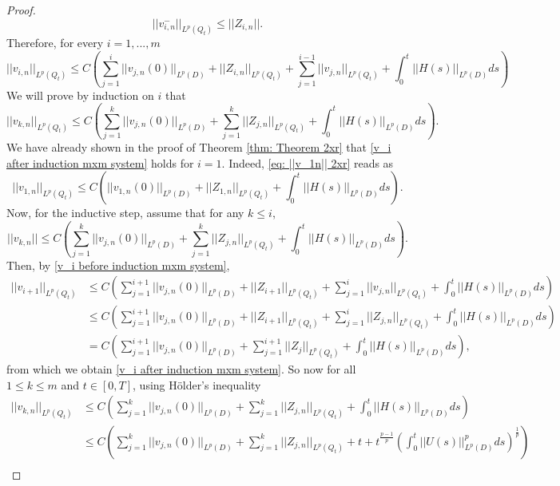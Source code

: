 \documentclass[12pt]{article}
\theoremstyle{definition}
\theoremstyle{remark}
\begin{document}
\begin{proof}
    \[
    ||v_{i,n}^{-}||_{L^p(Q_t)}\leq ||Z_{i,n}||.
    \]
    Therefore, for every $i=1,...,m$
    \begin{equation}\label{v_i before induction mxm system}
        ||v_{i,n}||_{L^p(Q_t)}\leq C\left(\sum_{j=1}^{i} ||v_{j,n}(0)||_{L^p(D)}+||Z_{i,n}||_{L^p(Q_t)}+\sum_{j=1}^{i-1}||v_{j,n}||_{L^p(Q_t)} + \int_0^t ||H(s)||_{L^p(D)}ds\right)
    \end{equation}
    We will prove by induction on $i$ that
    \begin{equation}\label{v_i after induction mxm system}
        ||v_{k,n}||_{L^p(Q_t)}\leq C\left(\sum_{j=1}^{k} ||v_{j,n}(0)||_{L^p(D)}+\sum_{j=1}^{k} ||Z_{j,n}||_{L^p(Q_t)}+\int_0^t ||H(s)||_{L^p(D)}ds\right).
    \end{equation}
    We have already shown in the proof of Theorem \ref{thm: Theorem 2xr} that \eqref{v_i after induction mxm system} holds for $i=1$. Indeed,  \eqref{eq: ||v_1n|| 2xr} reads as
    \[
    ||v_{1,n}||_{L^p(Q_t)} \leq C\left(||v_{1,n}(0)||_{L^p(D)}+||Z_{1,n}||_{L^p(Q_t)}+\int_0^t ||H(s)||_{L^p(D)}ds\right).
    \]
    Now, for the inductive step, assume that for any $k\leq i$,
    \[
    ||v_{k,n}||\leq C\left(\sum_{j=1}^{k} ||v_{j,n}(0)||_{L^p(D)}+\sum_{j=1}^{k} ||Z_{j,n}||_{L^p(Q_t)}+\int_0^t ||H(s)||_{L^p(D)}ds\right).
    \]
    Then, by \eqref{v_i before induction mxm system},
    \begin{align*}
        ||v_{i+1}||_{L^p(Q_t)}&\leq C\left(\sum_{j=1}^{i+1} ||v_{j,n}(0)||_{L^p(D)}+||Z_{i+1}||_{L^p(Q_t)} + \sum_{j=1}^i ||v_{j,n}||_{L^p(Q_t)} + \int_0^t ||H(s)||_{L^p(D)}ds\right)\\
        &\leq C\left(\sum_{j=1}^{i+1} ||v_{j,n}(0)||_{L^p(D)}+||Z_{i+1}||_{L^p(Q_t)}+\sum_{j=1}^i ||Z_{j,n}||_{L^p(Q_t)}+\int_0^t ||H(s)||_{L^p(D)}ds\right)\\
        &= C\left(\sum_{j=1}^{i+1} ||v_{j,n}(0)||_{L^p(D)}+\sum_{j=1}^{i+1}||Z_{j}||_{L^p(Q_t)}+\int_0^t ||H(s)||_{L^p(D)}ds\right),
    \end{align*}
    from which we obtain \eqref{v_i after induction mxm system}. So now for all $1\leq k\leq m$ and $t\in [0,T]$, using H\"older's inequality
    \begin{align*}
        ||v_{k,n}||_{L^p(Q_t)}&\leq C\left(\sum_{j=1}^{k} ||v_{j,n}(0)||_{L^p(D)}+\sum_{j=1}^k ||Z_{j,n}||_{L^p(Q_t)}+\int_0^t ||H(s)||_{L^p(D)}ds\right)\\
        &\leq C\left(\sum_{j=1}^{k} ||v_{j,n}(0)||_{L^p(D)}+\sum_{j=1}^k ||Z_{j,n}||_{L^p(Q_t)}+t+t^{\frac{p-1}{p}}\left(\int_0^t ||U(s)||^p_{L^p(D)}ds\right)^{\frac{1}{p}}\right)\\

\end{align*}
\end{proof}
\end{document}
